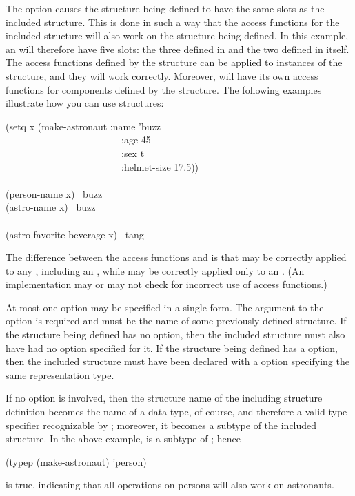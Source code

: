 \begin{flushdesc}
The  option causes the structure being defined
to have the same slots as the included structure.
This is done in such a way
that the access functions for the included
structure will also work on the structure being defined.
In this example, an
 will therefore have five slots: the three defined in
 and the two defined in 
itself.  The access functions defined by the  structure
can be applied to instances of the  structure, and they
will work correctly.
Moreover,  will have its own access functions for
components defined by the  structure.
The following examples illustrate how you can
use  structures:
\begin{lisp}
(setq x (make-astronaut :name 'buzz \\
~~~~~~~~~~~~~~~~~~~~~~~~:age 45 \\
~~~~~~~~~~~~~~~~~~~~~~~~:sex t \\
~~~~~~~~~~~~~~~~~~~~~~~~:helmet-size 17.5)) \\
 \\
(person-name x) \EV\ buzz \\
(astro-name x) \EV\ buzz \\
\\
(astro-favorite-beverage x) \EV\ tang
\end{lisp}
The difference between the access functions  and 
is that  may be correctly applied to any ,
including an , while  may be correctly
applied only to an .  (An implementation may or may not
check for incorrect use of access functions.)

At most one  option may be specified in a single
 form.
The argument to the  option is required and must be the
name of some previously defined structure.  If the structure being
defined has no  option, then the included structure must
also have had no  option specified for it.
If the structure being defined has a  option,
then the included structure must have been declared with a 
option specifying the same representation type.

If no  option is involved, then
the structure name of the including structure definition
becomes the name of a data type, of course, and therefore
a valid type specifier recognizable by ; moreover, it becomes
a subtype of the included structure.  In the above example,
 is a subtype of ; hence
\begin{lisp}
(typep (make-astronaut) 'person)
\end{lisp}
is true, indicating that all operations on persons will also
work on astronauts.


\end{flushdesc}
